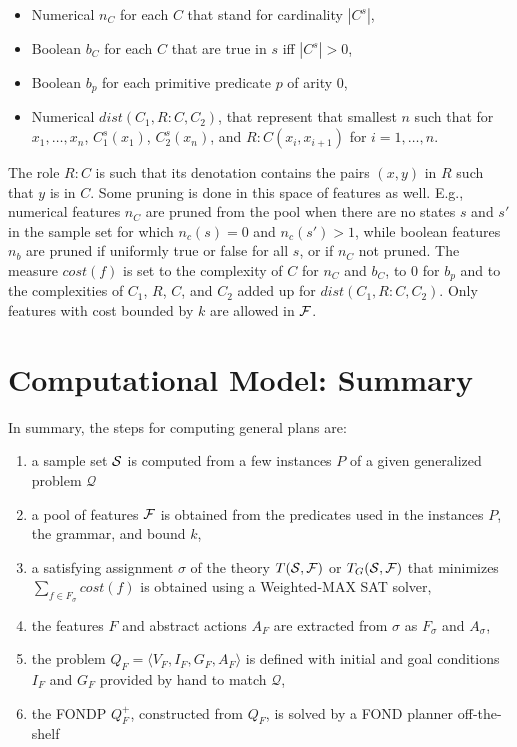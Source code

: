 \documentclass[letterpaper]{article} %
\newcommand{\tup}[1]{\langle #1 \rangle}
\newcommand{\Q}{\mathcal{Q}}
\begin{document}
\begin{itemize} 
\item Numerical   $n_C$ for each $C$  that  stand for cardinality $|C^s|$,
\item Boolean  $b_C$ for each   $C$ that are  true in $s$ iff $|C^s| > 0$,
\item Boolean   $b_p$ for each primitive predicate $p$ of arity $0$,
\item Numerical $\textit{dist}(C_1,R:C,C_2)$,  that represent that smallest $n$ such that for $x_1, \ldots, x_n$, 
$C_1^s(x_1)$, $C_2^s(x_{n})$, and $R:C(x_i,x_{i+1})$ for $i=1, \ldots, n$. 
\end{itemize}  


The role $R:C$ is such that its denotation contains the pairs $(x,y)$ in $R$ such that $y$ is in $C$.
Some pruning is done in this space of features as well. E.g., numerical features $n_C$ are pruned from the pool
when there are  no states $s$ and $s'$ in the sample set for which $n_c(s)=0$ and $n_c(s') > 1$,
while boolean features $n_b$  are pruned if uniformly true or false for all $s$, or if $n_C$ not pruned. 
The measure  $cost(f)$ is set to the complexity of $C$ for $n_C$ and $b_C$, to $0$ for $b_p$
and to the complexities of $C_1$, $R$, $C$, and $C_2$ added up for $\textit{dist}(C_1,R:C,C_2)$.
Only features with cost bounded by $k$ are allowed in $\cal F$.

\section{Computational Model: Summary}

In summary, the steps for computing general plans are:

\begin{enumerate}
\item a sample set ${\cal S}$ is computed from a few  instances $P$ of  a given generalized problem $\Q$ 
\item a pool of features $\cal F$ is obtained from the predicates used in the instances $P$, the  grammar, and bound $k$,
\item a satisfying assignment $\sigma$ of the theory $T({\cal S},{\cal F})$ or $T_G({\cal S},{\cal F})$
that minimizes  $\sum_{f \in F_{\sigma}} cost(f)$ is obtained using a Weighted-MAX SAT solver,
\item the features $F$ and abstract actions $A_F$  are extracted from $\sigma$ as $F_{\sigma}$ and $A_{\sigma}$,
\item the problem $Q_F=\tup{V_F,I_F,G_F,A_F}$ is  defined with initial and goal conditions $I_F$ and $G_F$ provided by hand
to match $\Q$, 
\item the FONDP  $Q^+_F$, constructed from $Q_F$,  is solved by a FOND planner off-the-shelf
\end{enumerate}
\end{document}
